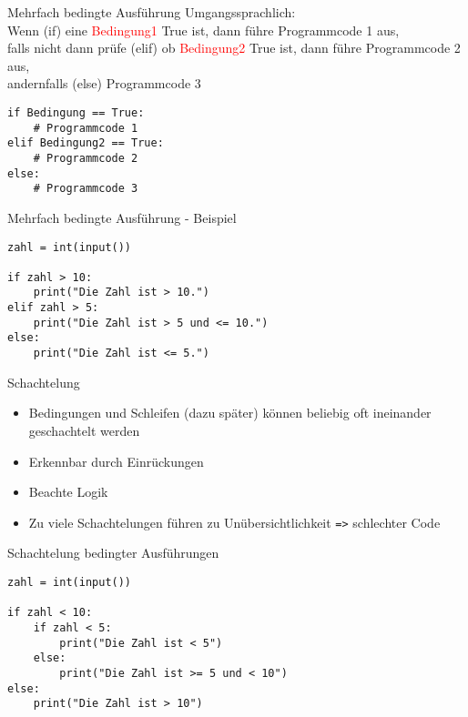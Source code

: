 \begin{frame}[fragile]{Mehrfach bedingte Ausführung}
Umgangssprachlich:\\ Wenn (if) eine \textcolor{red}{Bedingung1} True ist, dann führe Programmcode 1 aus, \\falls nicht dann prüfe (elif) ob \textcolor{red}{Bedingung2} True ist, dann führe Programmcode 2 aus, \\andernfalls (else) Programmcode 3\\

\begin{lstlisting}
if Bedingung == True:
	# Programmcode 1
elif Bedingung2 == True:
	# Programmcode 2
else:
	# Programmcode 3
\end{lstlisting}
\end{frame}

\begin{frame}[fragile]{Mehrfach bedingte Ausführung - Beispiel}
\begin{lstlisting}
zahl = int(input())

if zahl > 10:
	print("Die Zahl ist > 10.")
elif zahl > 5:
	print("Die Zahl ist > 5 und <= 10.")
else:
	print("Die Zahl ist <= 5.")
\end{lstlisting}
\end{frame}

\begin{frame}[fragile]{Schachtelung}
\begin{itemize}
	\item Bedingungen und Schleifen (dazu später) können beliebig oft ineinander geschachtelt werden
	\item Erkennbar durch Einrückungen
	\item Beachte Logik
	\item Zu viele Schachtelungen führen zu Unübersichtlichkeit \texttt{=>} schlechter Code
\end{itemize}
\end{frame}


\begin{frame}[fragile]{Schachtelung bedingter Ausführungen}

\begin{lstlisting}
zahl = int(input())

if zahl < 10:
	if zahl < 5:
		print("Die Zahl ist < 5")
	else:
		print("Die Zahl ist >= 5 und < 10")
else:
	print("Die Zahl ist > 10")
\end{lstlisting}
\end{frame}


